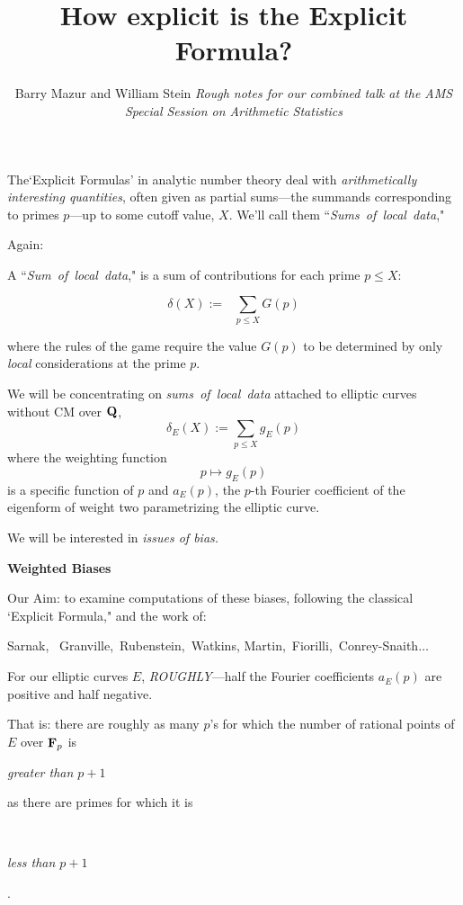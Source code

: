 \documentclass[12pt]{beamer}
\title[How explicit is the Explicit Formula?]
{How explicit is the Explicit Formula?}
\author[Barry Mazur and William Stein]{ Barry Mazur and William Stein\vskip30pt  {\it Rough notes for our combined talk at the  AMS Special Session on Arithmetic Statistics}}
\theoremstyle{definition}
\def\Q{\bf {Q}}
\begin{document}
\begin{frame}
\titlepage
\end{frame}
\begin{frame}\vskip30pt
{\Large The`Explicit Formulas' in analytic number theory deal with  {\it arithmetically interesting quantities}, often given as partial sums---the summands  corresponding to primes $p$---up to some cutoff value, $X$. We'll call them {``{\it Sums\ of\ local\ data},"}
\vskip40pt
\centerline{Again:}}
\end{frame}
\begin{frame}\vskip20pt
{\Large
   A  {``{\it Sum\ of\ local\ data},"} is a sum of contributions for each prime $ p \le X$:

  $$\delta(X):=\ \ \  \sum_{p\le X}G(p)$$

  where the rules of the game require the value $G(p)$ to be determined by only {\it local }considerations at the prime $p$.} \end{frame}\begin{frame}\vskip20pt
{\Large

We will be concentrating on  {\it sums\ of\ local\ data}  attached to elliptic curves without CM over ${\Q}$,   $$\delta_E(X):=\sum_{p\le X}g_E(p)$$ where the weighting function $$p \mapsto g_E(p)$$   is a specific function of $p$ and $a_E(p)$, the $p$-th Fourier coefficient of the eigenform of weight two parametrizing the elliptic curve.}  \end{frame}\begin{frame}\vskip20pt
{\Large

  We will  be interested in  {\it issues of bias.} \vskip40pt  \centerline{\bf Weighted Biases}} \end{frame}\begin{frame}\vskip20pt
{\Large  \vskip20pt

Our Aim: to examine computations of these biases, following the classical `Explicit Formula," and the work of:

\vskip40pt
Sarnak, \ Granville,\  Rubenstein,\ Watkins,\vskip30pt \hskip40pt Martin,\ Fiorilli,\ Conrey-Snaith$\dots$ } \end{frame}\begin{frame}\vskip20pt
{\Large  \vskip20pt
 For our elliptic curves $E$,\vskip20pt
 {\it ROUGHLY}---half the Fourier coefficients  $a_E(p)$ are positive and half negative.  } \end{frame}\begin{frame}\vskip20pt
{\Large \vskip20pt  That is: there are roughly as many $p$'s for which the number of rational points of $E$ over ${\bf F}_p$ is \vskip20pt \centerline{\it greater than $p+1$}  \vskip30pt \centerline{as there are primes for which it is} \vskip20pt \ \centerline{\it less than $p+1$}.       }  \end{frame}
\end{document}
